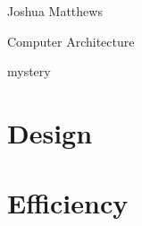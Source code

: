 \documentclass[letterpaper,12pt]{article}
\begin{document}
\noindent Joshua Matthews

\noindent Computer Architecture

\noindent mystery

\section{Design}

\section{Efficiency}
\end{document}
